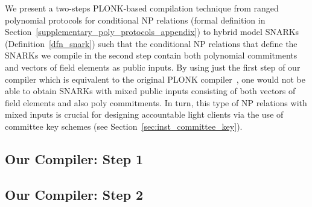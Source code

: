 \noindent We present a two-steps PLONK-based compilation technique from 
ranged polynomial protocols for conditional NP relations (formal definition in Section~\ref{supplementary_poly_protocols_appendix}) to hybrid 
model SNARKs (Definition~\ref{dfn_snark}) such that the conditional NP relations that define the SNARKs we compile in the 
second step contain both polynomial commitments and vectors of field elements as public inputs. By using just the first step of our 
compiler which is equivalent to the original PLONK compiler~\cite{plonk}, one would 
not be able to obtain SNARKs with mixed public inputs consisting of both vectors of field elements and also poly commitments. 
In turn, this type of NP relations with mixed inputs is crucial for designing accountable light clients via the use of committee key schemes 
(see Section~\ref{sec:inst_committee_key}).\\
\vspace{-0.2in}
\subsection{Our Compiler: Step 1} 
\label{compiler_step_1}
\vspace{-0.05in}
%

\vspace{-0.2in}
\subsection{Our Compiler: Step 2}
\label{compiler_step_2}
\vspace{-0.05in}


